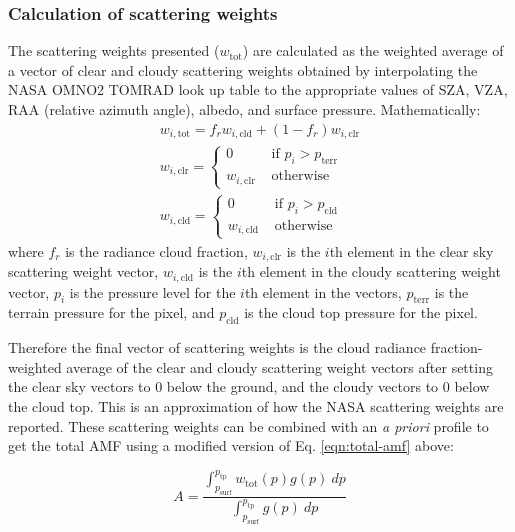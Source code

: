 \documentclass[12pt]{article}
\begin{document}
	\subsubsection{Calculation of scattering weights}
	The scattering weights presented ($w_{\mathrm{tot}}$) are calculated as the weighted average of a vector of clear and cloudy scattering weights obtained by interpolating the NASA OMNO2 TOMRAD look up table to the appropriate values of SZA, VZA, RAA (relative azimuth angle), albedo, and surface pressure. Mathematically:
	\begin{align}
		w_{i, \mathrm{tot}} = f_r w_{i, \mathrm{cld}} + (1 - f_r) w_{i, \mathrm{clr}} \label{eqn-pubSW}\\
		w_{i, \mathrm{clr}} = \left\lbrace 
			\begin{matrix}
				0 & \text{ if } p_i > p_\mathrm{terr} \\
				w_{i, \mathrm{clr}} & \text{ otherwise }
			\end{matrix}\right. \\
		w_{i, \mathrm{cld}} = \left\lbrace 
			\begin{matrix} 
				0 & \text{ if } p_i > p_\mathrm{cld} \\
				w_{i, \mathrm{cld}} & \text{ otherwise }
			\end{matrix}\right. \label{eqn-cldSW}
	\end{align}
	where $f_r$ is the radiance cloud fraction, $w_{i, \mathrm{clr}}$ is the $i$th element in the clear sky scattering weight vector, $w_{i, \mathrm{cld}}$ is the $i$th element in the cloudy scattering weight vector, $p_i$ is the pressure level for the $i$th element in the vectors, $p_\mathrm{terr}$ is the terrain pressure for the pixel, and $p_\mathrm{cld}$ is the cloud top pressure for the pixel.
	
	Therefore the final vector of scattering weights is the cloud radiance fraction-weighted average of the clear and cloudy scattering weight vectors after setting the clear sky vectors to 0 below the ground, and the cloudy vectors to 0 below the cloud top.  This is an approximation of how the NASA scattering weights are reported.  These scattering weights can be combined with an \emph{a priori}  profile to get the total AMF using a modified version of Eq. \eqref{eqn:total-amf} above:
	
	\begin{equation}\label{eqn:amf-published-sw}
	A = \frac{\int_{p_{\mathrm{surf}}}^{p_{\mathrm{tp}}} w_{\mathrm{tot}}(p) g(p) \: dp}{\int_{p_{\mathrm{surf}}}^{p_{\mathrm{tp}}} g(p) \: dp}
	\end{equation}
	
\end{document}
